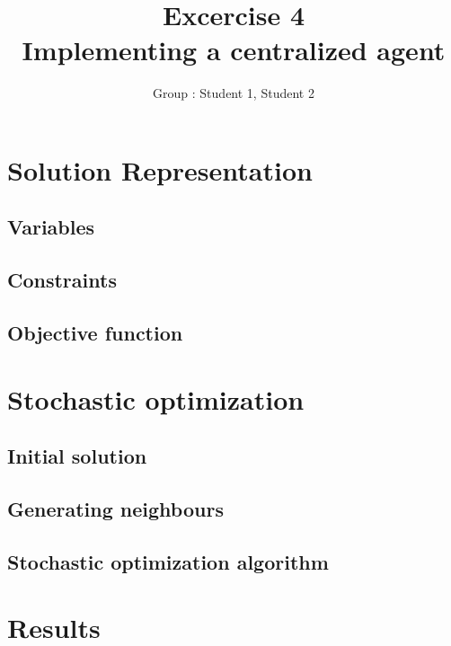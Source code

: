\documentclass[11pt]{article}
\title{\bf Excercise 4\\ Implementing a centralized agent}
\author{Group \textnumero : Student 1, Student 2}
\begin{document}
\maketitle

\section{Solution Representation}

\subsection{Variables}

\subsection{Constraints}

\subsection{Objective function}


\section{Stochastic optimization}

\subsection{Initial solution}

\subsection{Generating neighbours}

\subsection{Stochastic optimization algorithm}


\section{Results}
\end{document}
